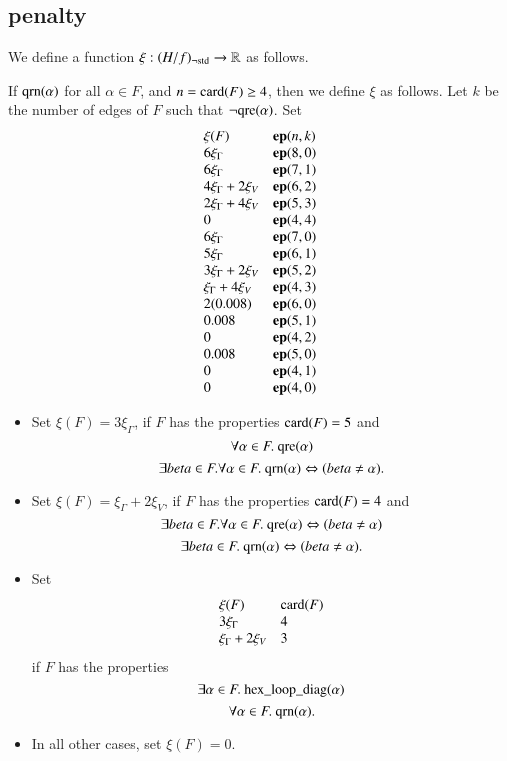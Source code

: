 \subsection{penalty}
\label{sec:pc}


We define a function $\xi:(H/f)_{\neg{\operatorname{std}}}\to\mathbb{R}$ as
follows.

If ${\operatorname{qrn}}(\alpha)$ for all $\alpha\in F$, and $n={\operatorname{card}}(F)\ge
4$, then we define $\xi$ as follows.  Let $k$ be the number of
edges of $F$ such that $\neg{\operatorname{qre}}(\alpha)$.  Set
    $$
    \begin{array}{lll}
    \xi(F) & {\operatorname{\bf ep}}{(n,k)}\\
    6 \xi_\Gamma & {\operatorname{\bf ep}}{(8,0)}\\
    6 \xi_\Gamma & {\operatorname{\bf ep}}{(7,1)}\\
    4 \xi_\Gamma + 2 \xi_V & {\operatorname{\bf ep}}{(6,2)}\\
    2 \xi_\Gamma + 4 \xi_V & {\operatorname{\bf ep}}{(5,3)}\\
    0 & {\operatorname{\bf ep}}{(4,4)}\\
    6 \xi_\Gamma & {\operatorname{\bf ep}}{(7,0)}\\
    5 \xi_\Gamma & {\operatorname{\bf ep}}{(6,1)}\\
    3\xi_\Gamma + 2 \xi_V & {\operatorname{\bf ep}}{(5,2)}\\
    \xi_\Gamma + 4\xi_V & {\operatorname{\bf ep}}{(4,3)}\\
    2(0.008) & {\operatorname{\bf ep}}{(6,0)} \\
    0.008 & {\operatorname{\bf ep}}{(5,1)} \\
    0 & {\operatorname{\bf ep}}{(4,2)} \\
    0.008 & {\operatorname{\bf ep}}{(5,0)} \\
    0 & {\operatorname{\bf ep}}{(4,1)} \\
    0 & {\operatorname{\bf ep}}{(4,0)}
    \end{array}
    $$
%
\begin{itemize}
\item Set
    $\xi(F) = 3\xi_\Gamma$, if $F$ has the properties ${\operatorname{card}}(F)=5$
    and
    $$\forall\alpha\in F.\
    {\operatorname{qre}}(\alpha)$$
    $$
    \exists beta\in F.\forall\alpha\in F.\
    {\operatorname{qrn}}(\alpha)\Leftrightarrow
(beta\ne\alpha).$$
%
%
\item Set $\xi(F) = \xi_\Gamma + 2\xi_V$, if $F$ has the
properties
    ${\operatorname{card}}(F)=4$ and
    $$\exists beta\in F.\forall\alpha\in F.\
    {\operatorname{qre}}(\alpha)\Leftrightarrow (beta\ne\alpha)
    $$
    $$\exists\beta\in F.\ \op{qrn}(\alpha)\Leftrightarrow
    (\beta\ne\alpha).$$
\item Set
    $$
    \begin{array}{lll}
    \xi(F) & {\operatorname{card}}(F)\\
    3 \xi_\Gamma & 4\\
     \xi_\Gamma + 2\xi_V & 3\\
    \end{array}
    $$
if $F$ has the properties
    $$
    \exists\alpha\in F.\ \op{hex\_loop\_diag}(\alpha)
    $$
    $$
    \forall\alpha\in F.\ \op{qrn}(\alpha).
    $$
\item In all other cases, set $\xi(F)=0$.
\end{itemize}


